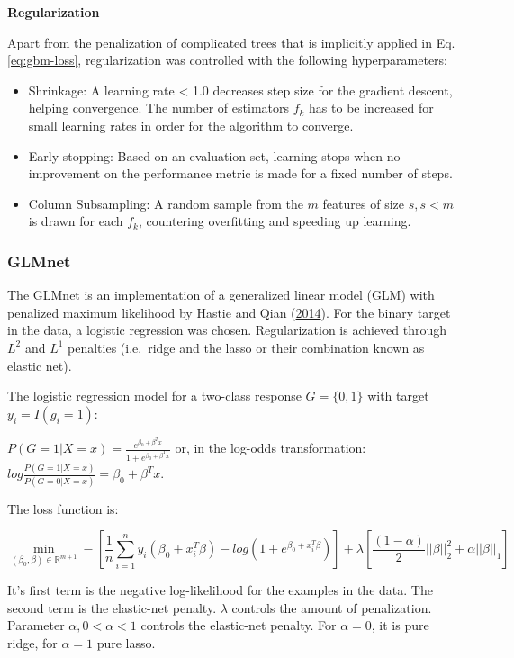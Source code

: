 \documentclass[
  11pt,
  a4paper,
  DIV=12,captions=tableheading,oneside]{scrbook}
\providecommand{\tightlist}{%
  \setlength{\itemsep}{0pt}\setlength{\parskip}{0pt}}
\providecommand{\tightlist}{%
  \setlength{\itemsep}{0pt}\setlength{\parskip}{0pt}}
\begin{document}
\textbf{Regularization}

Apart from the penalization of complicated trees that is implicitly applied in Eq. \eqref{eq:gbm-loss}, regularization was controlled with the following hyperparameters:

\begin{itemize}
\tightlist
\item
  Shrinkage: A learning rate \textless{} 1.0 decreases step size for the gradient descent, helping convergence. The number of estimators \(f_k\) has to be increased for small learning rates in order for the algorithm to converge.
\item
  Early stopping: Based on an evaluation set, learning stops when no improvement on the performance metric is made for a fixed number of steps.
\item
  Column Subsampling: A random sample from the \(m\) features of size \(s, s < m\) is drawn for each \(f_k\), countering overfitting and speeding up learning.
\end{itemize}

\hypertarget{glmnet}{%
\subsubsection{GLMnet}\label{glmnet}}

The GLMnet is an implementation of a generalized linear model (GLM) with penalized maximum likelihood by Hastie and Qian (\protect\hyperlink{ref-hastie2014glmnet}{2014}). For the binary target in the data, a logistic regression was chosen. Regularization is achieved through \(L^2\) and \(L^1\) penalties (i.e.~ridge and the lasso or their combination known as elastic net).

The logistic regression model for a two-class response \(G = \{0,1\}\) with target \(y_i = I(g_i=1)\):

\(P(G=1|X=x) = \frac{e^{\beta_0+\beta^Tx}}{1+e^{\beta_0+\beta^Tx}}\) or, in the log-odds transformation: \(log\frac{P(G=1|X=x)}{P(G=0|X=x)}=\beta_0+\beta^Tx\).

The loss function is:

\begin{equation}
\min_{(\beta_0,\beta) \in \mathbb{R}^{m+1}} - \left[\frac{1}{n}\sum_{i=1}^ny_i(\beta_0+x_i^T\beta)-log(1+e^{\beta_0+x_i^T\beta})\right] + \lambda\left[\frac{(1-\alpha)}{2}||\beta||_2^2+\alpha||\beta||_1\right]
\label{eq:glmnet}
\end{equation}

It's first term is the negative log-likelihood for the examples in the data. The second term is the elastic-net penalty. \(\lambda\) controls the amount of penalization. Parameter \(\alpha, 0 < \alpha < 1\) controls the elastic-net penalty. For \(\alpha = 0\), it is pure ridge, for \(\alpha = 1\) pure lasso.
\end{document}
